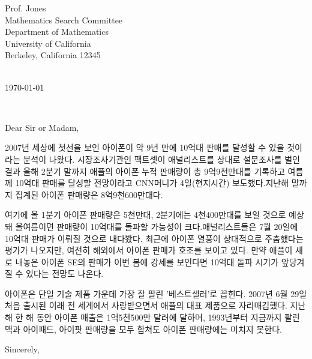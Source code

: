 \documentclass[11pt,a4paper]{letter} %
\def\opening#1{\thispagestyle{empty}
{\centering\fromaddress \vspace{0.6in} \\ %
\hspace*{\longindentation}\today\hspace*{\fill}\par} %
{\raggedright \toname \\ \toaddress \par} %
\vspace{0.4in} %
\noindent #1 %
}
\begin{document}



\begin{letter}
{Prof. Jones\\
Mathematics Search Committee\\
Department of Mathematics\\
University of California\\
Berkeley, California 12345\\
}


\opening{Dear Sir or Madam,}

2007년 세상에 첫선을 보인 아이폰이 약 9년 만에 10억대 판매를 달성할 수 있을 것이라는 분석이 나왔다. 시장조사기관인 팩트셋이 애널리스트를 상대로 설문조사를 벌인 결과 올해 2분기 말까지 애플의 아이폰 누적 판매량이 총 9억9천만대를 기록하고 여름께 10억대 판매를 달성할 전망이라고 CNN머니가 4일(현지시간) 보도했다.지난해 말까지 집계된 아이폰 판매량은 8억9천600만대다.

여기에 올 1분기 아이폰 판매량은 5천만대, 2분기에는 4천400만대를 보일 것으로 예상돼 올여름이면 판매량이 10억대를 돌파할 가능성이 크다.애널리스트들은 7월 20일에 10억대 판매가 이뤄질 것으로 내다봤다. 최근에 아이폰 열풍이 상대적으로 주춤했다는 평가가 나오지만, 여전히 해외에서 아이폰 판매가 호조를 보이고 있다. 만약 애플이 새로 내놓은 아이폰 SE의 판매가 이번 봄에 강세를 보인다면 10억대 돌파 시기가 앞당겨질 수 있다는 전망도 나온다.

아이폰은 단일 기술 제품 가운데 가장 잘 팔린 '베스트셀러'로 꼽힌다. 2007년 6월 29일 처음 출시된 이래 전 세계에서 사랑받으면서 애플의 대표 제품으로 자리매김했다. 지난해 한 해 동안 아이폰 매출은 1억5천500만 달러에 달하며, 1993년부터 지금까지 팔린 맥과 아이패드, 아이팟 판매량을 모두 합쳐도 아이폰 판매량에는 미치지 못한다.

\closing{Sincerely,}


\end{letter}
\end{document}
